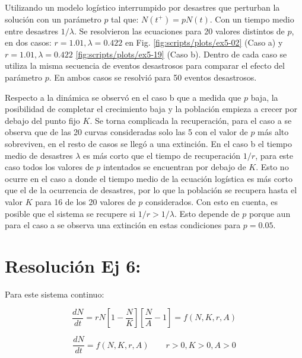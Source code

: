 \documentclass[twocolumn,aps,prl]{revtex4-1}
\begin{document}
Utilizando un modelo logístico interrumpido por desastres que perturban la solución con un parámetro $p$ tal que: $N(t^+)=pN(t)$. Con un tiempo medio entre desastres $1/\lambda$. Se resolvieron las ecuaciones para 20 valores distintos de $p$, en dos casos: $r = \text{1.01}, \lambda = \text{0.422}$ en Fig. \ref{fig:scripts/plots/ex5-02} (Caso a) y $r = \text{1.01}, \lambda = \text{0.422}$ \ref{fig:scripts/plots/ex5-19} (Caso b). Dentro de cada caso se utiliza la misma secuencia de eventos desastrosos para comparar el efecto del parámetro $p$. En ambos casos se resolvió para 50 eventos desastrosos. 

Respecto a la dinámica se observó en el caso b que a medida que $p$ baja, la posibilidad de completar el crecimiento baja y la población empieza a crecer por debajo del punto fijo $K$. Se torna complicada la recuperación, para el caso a se observa que de las 20 curvas consideradas solo las 5 con el valor de $p$ más alto sobreviven, en el resto de casos se llegó a una extinción. 
En el caso b el tiempo medio de desastres $\lambda$ es más corto que el tiempo de recuperación $1/r$, para este caso todos los valores de $p$ intentados se encuentran por debajo de $K$. Esto no ocurre en el caso a donde el tiempo medio de la ecuación logística es más corto que el de la ocurrencia de desastres, por lo que la población se recupera hasta el valor $K$ para 16 de los 20 valores de $p$ considerados. Con esto en cuenta, es posible que el sistema se recupere si $1/r > 1/\lambda$. Esto depende de $p$ porque aun para el caso a se observa una extinción en estas condiciones para $p =\text{0.05}$.

% 
%                              
% 

\section{Resolución Ej 6:}

Para este sistema continuo:

\begin{equation}\label{eqn:Alle}
\frac{d N}{d t} =r N\left[1-\frac{N}{K}\right]\left[\frac{N}{A}-1\right] = f(N, K, r, A)
\end{equation}


$$
\frac{d N}{d t} = f(N, K, r, A) \qquad r>0, K>0 , A>0
$$
\end{document}
